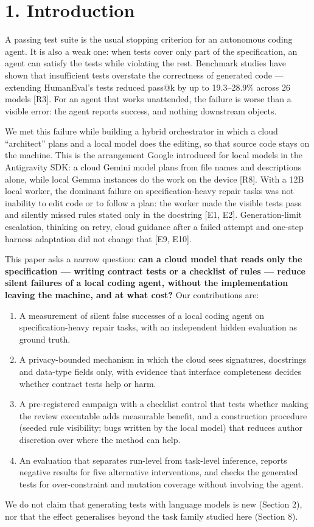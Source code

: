 \documentclass[11pt]{article}
\begin{document}
\section*{1. Introduction}
A passing test suite is the usual stopping criterion for an autonomous coding agent. It is also a weak one: when tests cover only part of the specification, an agent can satisfy the tests while violating the rest. Benchmark studies have shown that insufficient tests overstate the correctness of generated code — extending HumanEval's tests reduced pass@k by up to 19.3–28.9\% across 26 models [R3]. For an agent that works unattended, the failure is worse than a visible error: the agent reports success, and nothing downstream objects.

We met this failure while building a hybrid orchestrator in which a cloud ``architect'' plans and a local model does the editing, so that source code stays on the machine. This is the arrangement Google introduced for local models in the Antigravity SDK: a cloud Gemini model plans from file names and descriptions alone, while local Gemma instances do the work on the device [R8]. With a 12B local worker, the dominant failure on specification-heavy repair tasks was not inability to edit code or to follow a plan: the worker made the visible tests pass and silently missed rules stated only in the docstring [E1, E2]. Generation-limit escalation, thinking on retry, cloud guidance after a failed attempt and one-step harness adaptation did not change that [E9, E10].

This paper asks a narrow question: \textbf{can a cloud model that reads only the specification — writing contract tests or a checklist of rules — reduce silent failures of a local coding agent, without the implementation leaving the machine, and at what cost?} Our contributions are:

\begin{enumerate}
\item A measurement of silent false successes of a local coding agent on specification-heavy repair tasks, with an independent hidden evaluation as ground truth.
\item A privacy-bounded mechanism in which the cloud sees signatures, docstrings and data-type fields only, with evidence that interface completeness decides whether contract tests help or harm.
\item A pre-registered campaign with a checklist control that tests whether making the review executable adds measurable benefit, and a construction procedure (seeded rule visibility; bugs written by the local model) that reduces author discretion over where the method can help.
\item An evaluation that separates run-level from task-level inference, reports negative results for five alternative interventions, and checks the generated tests for over-constraint and mutation coverage without involving the agent.
\end{enumerate}
We do not claim that generating tests with language models is new (Section 2), nor that the effect generalises beyond the task family studied here (Section 8).
\end{document}
